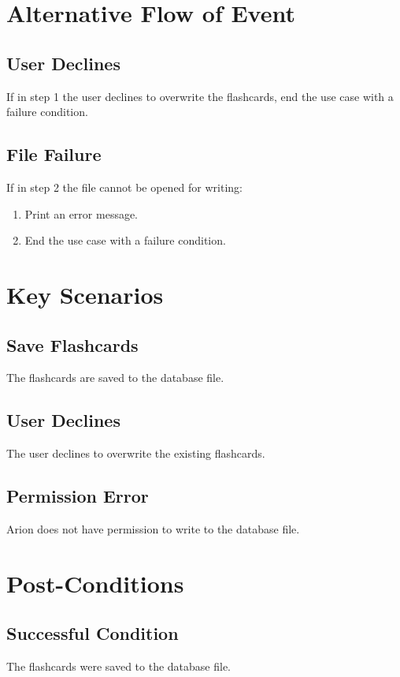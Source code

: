 \documentclass{scrreprt}
\begin{document}
\section{Alternative Flow of Event}

    \subsection{User Declines}
    If in step 1 the user declines to overwrite the flashcards,
    end the use case with a failure condition.

    \subsection{File Failure}
    If in step 2 the file cannot be opened for writing:
    \begin{enumerate}[1.]
        \item Print an error message.
        \item End the use case with a failure condition.
    \end{enumerate}

\section{Key Scenarios}
    \subsection{Save Flashcards}
    The flashcards are saved to the database file.
    
    \subsection{User Declines}
    The user declines to overwrite the existing flashcards.

    \subsection{Permission Error}
    Arion does not have permission to write to the database file.

\section{Post-Conditions}
    \subsection{Successful Condition}
    The flashcards were saved to the database file.
    
\end{document}
